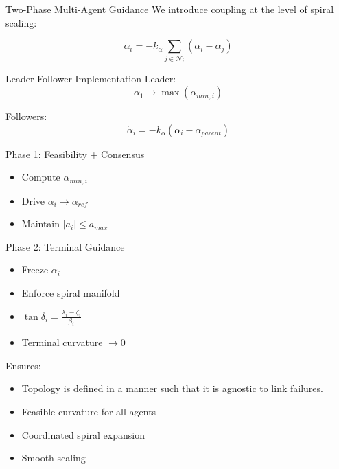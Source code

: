 \begin{frame}{Two-Phase Multi-Agent Guidance}
We introduce coupling at the level of spiral scaling:

\[
\dot{\alpha}_i = -k_\alpha \sum_{j \in \mathcal{N}_i}
(\alpha_i - \alpha_j)
\]

\begin{block}{Leader-Follower Implementation}
	Leader:
	\[
	\alpha_1 \rightarrow \max(\alpha_{min,i})
	\]
	
	Followers:
	\[
	\dot{\alpha}_i = -k_\alpha (\alpha_i - \alpha_{parent})
	\]
\end{block}
	\begin{block}{Phase 1: Feasibility + Consensus}
		\begin{itemize}
			\item Compute $\alpha_{min,i}$
			\item Drive $\alpha_i \rightarrow \alpha_{ref}$
			\item Maintain $|a_i| \le a_{max}$
		\end{itemize}
	\end{block}
\end{frame}
\begin{frame}	
	\begin{block}{Phase 2: Terminal Guidance}
		\begin{itemize}
			\item Freeze $\alpha_i$
			\item Enforce spiral manifold
			\item $\tan \delta_i = \frac{\lambda_i - \zeta_i}{\beta_i}$
			\item Terminal curvature $\rightarrow 0$
		\end{itemize}
	\end{block}
		Ensures:
	\begin{itemize}
		\item Topology is defined in a manner such that it is agnostic to link failures.
		\item Feasible curvature for all agents
		\item Coordinated spiral expansion
		\item Smooth scaling 
	\end{itemize}
\end{frame}
